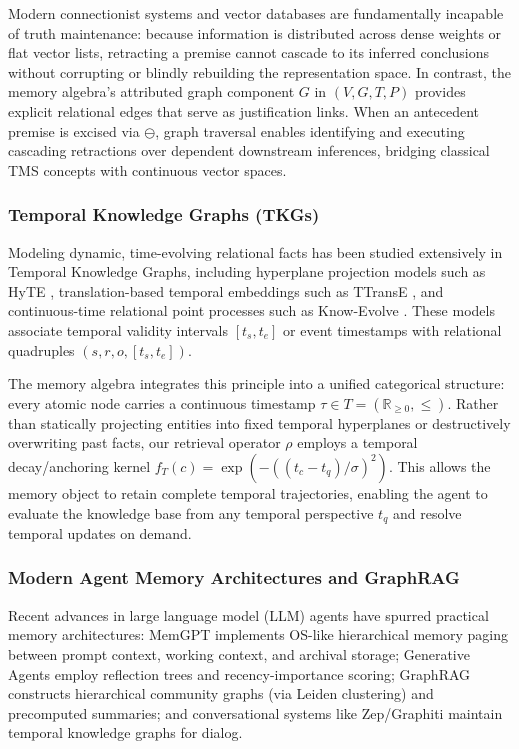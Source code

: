 \documentclass[11pt,a4paper]{article}
\theoremstyle{definition}
\begin{document}
Modern connectionist systems and vector databases are fundamentally incapable of truth maintenance: because information is distributed across dense weights or flat vector lists, retracting a premise cannot cascade to its inferred conclusions without corrupting or blindly rebuilding the representation space. In contrast, the memory algebra's attributed graph component $G$ in $(V, G, T, P)$ provides explicit relational edges that serve as justification links. When an antecedent premise is excised via $\ominus$, graph traversal enables identifying and executing cascading retractions over dependent downstream inferences, bridging classical TMS concepts with continuous vector spaces.

\subsubsection{Temporal Knowledge Graphs (TKGs)}
Modeling dynamic, time-evolving relational facts has been studied extensively in Temporal Knowledge Graphs, including hyperplane projection models such as HyTE \cite{dasgupta2018hyte}, translation-based temporal embeddings such as TTransE \cite{leblay2018deriving}, and continuous-time relational point processes such as Know-Evolve \cite{trivedi2017know}. These models associate temporal validity intervals $[t_s, t_e]$ or event timestamps with relational quadruples $(s, r, o, [t_s, t_e])$.

The memory algebra integrates this principle into a unified categorical structure: every atomic node carries a continuous timestamp $\tau \in T = (\mathbb{R}_{\geq 0}, \leq)$. Rather than statically projecting entities into fixed temporal hyperplanes or destructively overwriting past facts, our retrieval operator $\rho$ employs a temporal decay/anchoring kernel $f_T(c) = \exp(-((t_c - t_q)/\sigma)^2)$. This allows the memory object to retain complete temporal trajectories, enabling the agent to evaluate the knowledge base from any temporal perspective $t_q$ and resolve temporal updates on demand.

\subsubsection{Modern Agent Memory Architectures and GraphRAG}
Recent advances in large language model (LLM) agents have spurred practical memory architectures: MemGPT \cite{packer2023memgpt} implements OS-like hierarchical memory paging between prompt context, working context, and archival storage; Generative Agents \cite{park2023generative} employ reflection trees and recency-importance scoring; GraphRAG \cite{edge2024local} constructs hierarchical community graphs (via Leiden clustering) and precomputed summaries; and conversational systems like Zep/Graphiti maintain temporal knowledge graphs for dialog.
\end{document}
